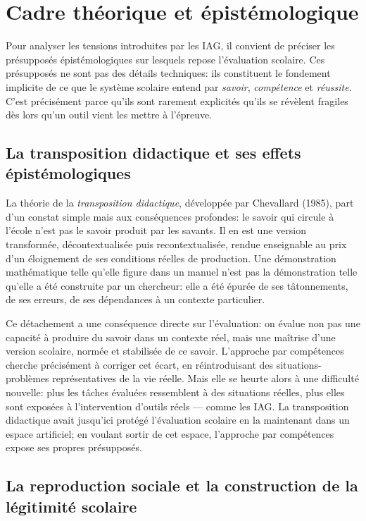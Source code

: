 \section{Cadre théorique et épistémologique}\label{sec:cadre}

Pour analyser les tensions introduites par les IAG, il convient de préciser les présupposés épistémologiques sur lesquels repose l'évaluation scolaire.
Ces présupposés ne sont pas des détails techniques: ils constituent le fondement implicite de ce que le système scolaire entend par \emph{savoir}, \emph{compétence} et \emph{réussite}.
C'est précisément parce qu'ils sont rarement explicités qu'ils se révèlent fragiles dès lors qu'un outil vient les mettre à l'épreuve.

\subsection{La transposition didactique et ses effets épistémologiques}

La théorie de la \emph{transposition didactique}, développée par Chevallard (1985), part d'un constat simple mais aux conséquences profondes: le savoir qui circule à l'école n'est pas le savoir produit par les savants. 
Il en est une version transformée, décontextualisée puis recontextualisée, rendue enseignable au prix d'un éloignement de ses conditions réelles de production. 
Une démonstration mathématique telle qu'elle figure dans un manuel n'est pas la démonstration telle qu'elle a été construite par un chercheur: elle a été épurée de ses tâtonnements, de ses erreurs, de ses dépendances à un contexte particulier.

Ce détachement a une conséquence directe sur l'évaluation: on évalue non pas une capacité à produire du savoir dans un contexte réel, mais une maîtrise d'une version scolaire, normée et stabilisée de ce savoir.
L'approche par compétences cherche précisément à corriger cet écart, en réintroduisant des situations-problèmes représentatives de la vie réelle. 
Mais elle se heurte alors à une difficulté nouvelle: plus les tâches évaluées ressemblent à des situations réelles, plus elles sont exposées à l'intervention d'outils réels --- comme les IAG.\@
La transposition didactique avait jusqu'ici protégé l'évaluation scolaire en la maintenant dans un espace artificiel; en voulant sortir de cet espace, l'approche par compétences expose ses propres présupposés.

\subsection{La reproduction sociale et la construction de la légitimité scolaire}

